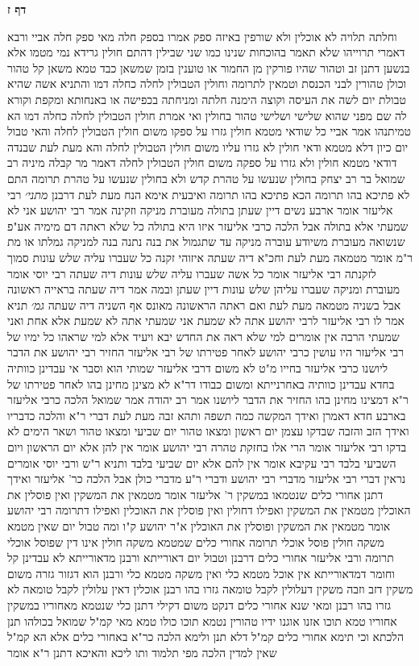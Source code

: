 \documentclass[12pt, openany]{book}
\newcommand{\sethebfont}{
\fontsize{10.5pt}{21.0pt} \selectfont
}
\newcommand{\twocol}[1]{
	{\sethebfont \begin{multicols}{2}
			#1
	\end{multicols}}	
}
\newcommand{\sectname}{}
\newcommand{\newsection}[1]{
	\addcontentsline{toc}{section}{#1}
	\renewcommand{\sectname}{#1}	
	\vspace{-\baselineskip}
	\begin{center}
		\textbf{%
\fontsize{16pt}{16pt}\selectfont
			#1}
	\end{center}
	\vspace{-\baselineskip}
	\nopagebreak
}
\begin{document}
\newsection{דף ז}
\twocol{וחלתה תלויה לא אוכלין ולא שורפין באיזה ספק אמרו בספק חלה מאי ספק חלה 
אביי ורבא דאמרי תרוייהו שלא תאמר בהוכחות שנינו כמו שני שבילין דהתם חולין גרידא נמי מטמו
אלא בנשען דתנן זב וטהור שהיו פורקין מן החמור או טוענין בזמן שמשאן כבד טמא משאן קל טהור וכולן טהורין לבני הכנסת וטמאין לתרומה 
וחולין הטבולין לחלה כחלה דמו והתניא אשה שהיא טבולת יום לשה את העיסה וקוצה הימנה חלתה ומניחתה בכפישה או באנחותא ומקפת וקורא לה שם
מפני שהוא שלישי ושלישי טהור בחולין ואי אמרת חולין הטבולין לחלה כחלה דמו הא טמיתנהו 
אמר אביי כל שודאי מטמא חולין גזרו על ספקו משום חולין הטבולין לחלה והאי טבול יום כיון דלא מטמא ודאי חולין לא גזרו עליו משום חולין הטבולין לחלה 
והא מעת לעת שבנדה דודאי מטמא חולין ולא גזרו על ספקה משום חולין הטבולין לחלה 
דאמר מר קבלה מיניה רב שמואל בר רב יצחק בחולין שנעשו על טהרת קדש ולא בחולין שנעשו על טהרת תרומה 
התם לא פתיכא בהו תרומה הכא פתיכא בהו תרומה 
ואיבעית אימא הנח מעת לעת דרבנן
{\large\emph{מתני׳}} רבי אליעזר אומר ארבע נשים דיין שעתן בתולה מעוברת מניקה וזקינה אמר רבי יהושע אני לא שמעתי אלא בתולה
אבל הלכה כרבי אליעזר 
איזו היא בתולה כל שלא ראתה דם מימיה אע"פ שנשואה מעוברת משיודע עוברה מניקה עד שתגמול את בנה נתנה בנה למניקה גמלתו או מת ר"מ אומר מטמאה מעת לעת וחכ"א דיה שעתה 
איזוהי זקנה כל שעברו עליה שלש עונות סמוך לזקנתה רבי אליעזר אומר כל אשה שעברו עליה שלש עונות דיה שעתה רבי יוסי אומר מעוברת ומניקה שעברו עליהן שלש עונות דיין שעתן 
ובמה אמר דיה שעתה בראייה ראשונה אבל בשניה מטמאה מעת לעת ואם ראתה הראשונה מאונס אף השניה דיה שעתה
{\large\emph{גמ׳}} תניא אמר לו רבי אליעזר לרבי יהושע אתה לא שמעת אני שמעתי אתה לא שמעת אלא אחת ואני שמעתי הרבה 
אין אומרים למי שלא ראה את החדש יבא ויעיד אלא למי שראהו כל ימיו של רבי אליעזר היו עושין כרבי יהושע לאחר פטירתו של רבי אליעזר החזיר רבי יהושע את הדבר ליושנו 
כרבי אליעזר בחייו מ"ט לא משום דרבי אליעזר שמותי הוא וסבר אי עבדינן כוותיה בחדא עבדינן כוותיה באחרנייתא
ומשום כבודו דר"א לא מצינן מחינן בהו לאחר פטירתו של ר"א דמצינו מחינן בהו החזיר את הדבר ליושנו 
אמר רב יהודה אמר שמואל הלכה כרבי אליעזר בארבע חדא דאמרן 
ואידך המקשה כמה תשפה ותהא זבה מעת לעת דברי ר"א והלכה כדבריו 
ואידך הזב והזבה שבדקו עצמן יום ראשון ומצאו טהור יום שביעי ומצאו טהור ושאר הימים לא בדקו רבי אליעזר אומר הרי אלו בחזקת טהרה רבי יהושע אומר אין להן אלא יום הראשון ויום השביעי בלבד 
רבי עקיבא אומר אין להם אלא יום שביעי בלבד ותניא ר"ש ורבי יוסי אומרים נראין דברי רבי אליעזר מדברי רבי יהושע ודברי ר"ע מדברי כולן אבל הלכה כר' אליעזר 
ואידך דתנן אחורי כלים שנטמאו במשקין ר' אליעזר אומר מטמאין את המשקין ואין פוסלין את האוכלין מטמאין את המשקין ואפילו דחולין ואין פוסלין את האוכלין ואפילו דתרומה רבי יהושע אומר מטמאין את המשקין ופוסלין את האוכלין 
א"ר יהושע ק"ו ומה טבול יום שאין מטמא משקה חולין פוסל אוכלי תרומה אחורי כלים שמטמא משקה חולין אינו דין שפוסל אוכלי תרומה 
ורבי אליעזר אחורי כלים דרבנן וטבול יום דאורייתא ורבנן מדאורייתא לא עבדינן קל וחומר דמדאורייתא אין אוכל מטמא כלי ואין משקה מטמא כלי
ורבנן הוא דגזור גזרה משום משקין דזב וזבה משקין דעלולין לקבל טומאה גזרו בהו רבנן אוכלין דאין עלולין לקבל טומאה לא גזרו בהו רבנן 
ומאי שנא אחורי כלים דנקט משום דקילי דתנן כלי שנטמא מאחוריו במשקין אחוריו טמא תוכו אזנו אוגנו ידיו טהורין נטמא תוכו כולו טמא 
מאי קמ"ל שמואל בכולהו תנן הלכתא 
וכי תימא אחורי כלים קמ"ל דלא תנן ולימא הלכה כר"א באחורי כלים אלא הא קמ"ל שאין למדין הלכה מפי תלמוד 
ותו ליכא והאיכא דתנן ר"א אומר}
\end{document}
